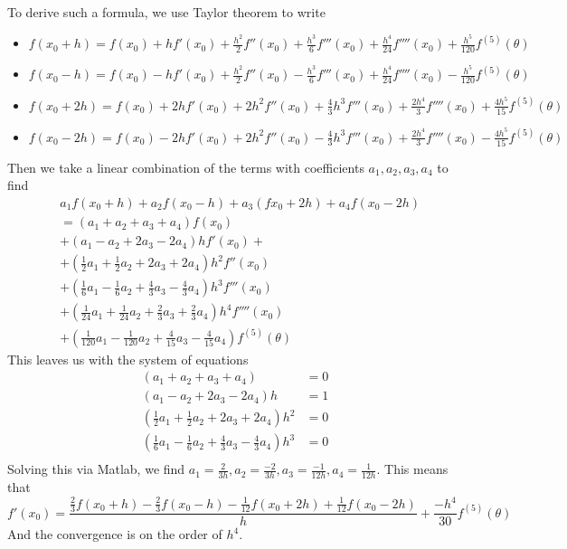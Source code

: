 \documentclass{article}
\begin{document}
\section{}
To derive such a formula, we use Taylor theorem to write
\begin{itemize}
\item \(f(x_0+h) = f(x_0) + hf'(x_0) + \frac{h^2}{2}f''(x_0) +
  \frac{h^3}{6}f'''(x_0) + \frac{h^4}{24}f''''(x_0) +
  \frac{h^5}{120}f^{(5)}(\theta)\)
\item \(f(x_0-h) = f(x_0) - hf'(x_0) + \frac{h^2}{2}f''(x_0) -
  \frac{h^3}{6}f'''(x_0) + \frac{h^4}{24}f''''(x_0) -
  \frac{h^5}{120}f^{(5)}(\theta)\)
\item \(f(x_0+2h) = f(x_0) + 2hf'(x_0) + 2h^2f''(x_0) +
  \frac{4}{3}h^3f'''(x_0) + \frac{2h^4}{3}f''''(x_0) +
  \frac{4h^5}{15}f^{(5)}(\theta)\)
\item \(f(x_0-2h) = f(x_0) - 2hf'(x_0) + 2h^2f''(x_0) -
  \frac{4}{3}h^3f'''(x_0) + \frac{2h^4}{3}f''''(x_0) -
  \frac{4h^5}{15}f^{(5)}(\theta)\)
\end{itemize}
Then we take a linear combination of the terms with coefficients
\(a_1, a_2, a_3, a_4\) to find
\begin{align*}
  &a_1f(x_0+h) + a_2f(x_0-h) + a_3(fx_0+2h) + a_4f(x_0-2h)\\
  &=(a_1+a_2+a_3+a_4)f(x_0)\\
  &+ (a_1-a_2+2a_3-2a_4)hf'(x_0) + \\
  &+(\frac{1}{2}a_1 + \frac{1}{2}a_2 + 2a_3 + 2a_4)h^2f''(x_0)\\
  &+(\frac{1}{6}a_1 - \frac{1}{6}a_2 + \frac{4}{3}a_3 - \frac{4}{3}a_4)h^3f'''(x_0)\\
  &+(\frac{1}{24}a_1 + \frac{1}{24}a_2 + \frac{2}{3}a_3 + \frac{2}{3}a_4)h^4f''''(x_0)\\
  &+(\frac{1}{120}a_1 - \frac{1}{120}a_2 + \frac{4}{15}a_3 - \frac{4}{15}a_4)f^{(5)}(\theta)
\end{align*}
This leaves us with the system of equations
\begin{align*}
  (a_1+a_2+a_3+a_4) &= 0\\
  (a_1-a_2+2a_3-2a_4)h &= 1\\
  (\frac{1}{2}a_1 + \frac{1}{2}a_2 + 2a_3 + 2a_4)h^2 &= 0\\
  (\frac{1}{6}a_1 - \frac{1}{6}a_2 + \frac{4}{3}a_3 - \frac{4}{3}a_4)h^3 &= 0\\
\end{align*}
Solving this via Matlab, we find \(a_1=\frac{2}{3h},
a_2=\frac{-2}{3h}, a_3=\frac{-1}{12h}, a_4=\frac{1}{12h}\). This means
that
\[f'(x_0) = \frac{\frac{2}{3}f(x_0+h) - \frac{2}{3}f(x_0-h)
  - \frac{1}{12}f(x_0+2h) + \frac{1}{12}f(x_0-2h)}{h}
+ \frac{-h^4}{30}f^{(5)}(\theta)\]
And the convergence is on the order of \(h^4\).
  
\end{document}
